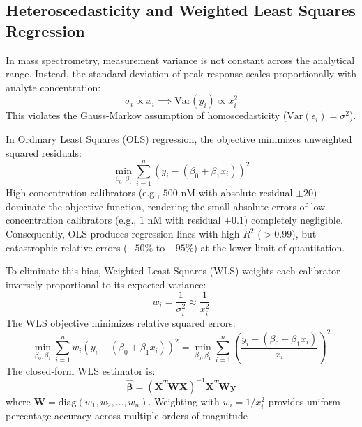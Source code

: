 \documentclass[11pt,twoside,openright]{book}
\begin{document}
\subsection{Heteroscedasticity and Weighted Least Squares Regression}
In mass spectrometry, measurement variance is not constant across the analytical range. Instead, the standard deviation of peak response scales proportionally with analyte concentration:
\begin{equation}
\sigma_i \propto x_i \implies \text{Var}(y_i) \propto x_i^2
\label{eq:heteroscedasticity}
\end{equation}
This violates the Gauss-Markov assumption of homoscedasticity ($\text{Var}(\epsilon_i) = \sigma^2$).

In Ordinary Least Squares (OLS) regression, the objective minimizes unweighted squared residuals:
\begin{equation}
\min_{\beta_0, \beta_1} \sum_{i=1}^n (y_i - (\beta_0 + \beta_1 x_i))^2
\label{eq:ols_objective}
\end{equation}
High-concentration calibrators (e.g., $500$ nM with absolute residual $\pm 20$) dominate the objective function, rendering the small absolute errors of low-concentration calibrators (e.g., $1$ nM with residual $\pm 0.1$) completely negligible. Consequently, OLS produces regression lines with high $R^2$ ($> 0.99$), but catastrophic relative errors ($-50\%$ to $-95\%$) at the lower limit of quantitation.

To eliminate this bias, Weighted Least Squares (WLS) weights each calibrator inversely proportional to its expected variance:
\begin{equation}
w_i = \frac{1}{\sigma_i^2} \approx \frac{1}{x_i^2}
\label{eq:wls_weight}
\end{equation}
The WLS objective minimizes relative squared errors:
\begin{equation}
\min_{\beta_0, \beta_1} \sum_{i=1}^n w_i \left( y_i - (\beta_0 + \beta_1 x_i) \right)^2 = \min_{\beta_0, \beta_1} \sum_{i=1}^n \left( \frac{y_i - (\beta_0 + \beta_1 x_i)}{x_i} \right)^2
\label{eq:wls_objective}
\end{equation}
The closed-form WLS estimator is:
\begin{equation}
\hat{\boldsymbol{\beta}} = (\mathbf{X}^T \mathbf{W} \mathbf{X})^{-1} \mathbf{X}^T \mathbf{W} \mathbf{y}
\label{eq:wls_matrix}
\end{equation}
where $\mathbf{W} = \text{diag}(w_1, w_2, \dots, w_n)$. Weighting with $w_i = 1/x_i^2$ provides uniform percentage accuracy across multiple orders of magnitude \cite{mani2012statistical, fda2018bioanalytical}.
\end{document}
